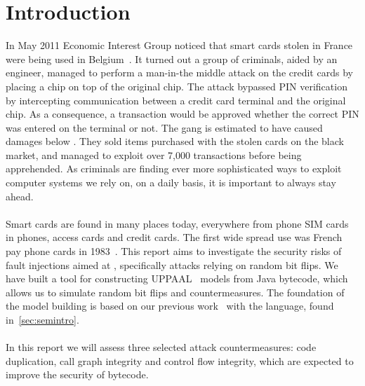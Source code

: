 \chapter{Introduction}
In May 2011 Economic Interest Group noticed that smart cards stolen in France were being used in Belgium~\cite{fun}. It turned out a group of criminals, aided by an engineer, managed to perform a man-in-the middle attack on the credit cards by placing a chip on top of the original chip. The attack bypassed PIN verification by intercepting communication between a credit card terminal and the original chip. As a consequence, a transaction would be approved whether the correct PIN was entered on the terminal or not. The gang is estimated to have caused damages below . They sold items purchased with the stolen cards on the black market, and managed to exploit over 7,000 transactions before being apprehended. As criminals are finding ever more sophisticated ways to exploit computer systems we rely on, on a daily basis, it is important to always stay ahead.\\\\
Smart cards are found in many places today, everywhere from phone SIM cards in phones, access cards and credit cards. The first wide spread use was French pay phone cards in 1983~\cite[p. 366]{modbank}. This report aims to investigate the security risks of fault injections aimed at \jc, specifically attacks relying on random bit flips. 
We have built a tool for constructing UPPAAL~\cite{upptut} models from Java bytecode, which allows us to simulate random bit flips and countermeasures. 
The foundation of the model building is based on our previous work~\cite{javasec} with the \jcl language, found in~\cref{sec:semintro}.\\\\
In this report we will assess three selected attack countermeasures: code duplication, call graph integrity and control flow integrity, which are expected to improve the security of \jc bytecode.
